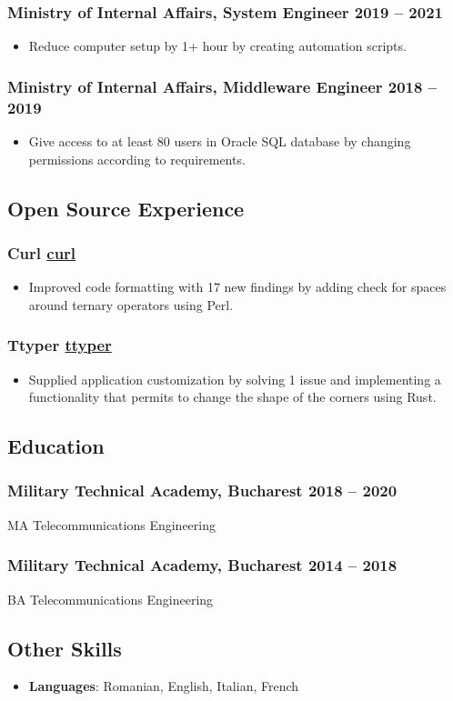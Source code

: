 \documentclass[a4paper,12pt]{article}
\begin{document}
\subsubsection*{\textbf{Ministry of Internal Affairs}, System Engineer \hfill 2019 -- 2021}
\label{sec:org07f0b0a}
\begin{itemize}
\item Reduce computer setup by 1+ hour by creating automation scripts.
\end{itemize}
\subsubsection*{\textbf{Ministry of Internal Affairs}, Middleware Engineer \hfill 2018 -- 2019}
\label{sec:orgb471112}
\begin{itemize}
\item Give access to at least 80 users in Oracle SQL database by changing permissions according
to requirements.
\end{itemize}
\subsection*{\textbf{Open Source Experience}}
\label{sec:org47d0989}
\subsubsection*{\textbf{Curl} \hfill \href{https://github.com/curl/curl}{curl}}
\label{sec:org3cd7b35}
\begin{itemize}
\item Improved code formatting with 17 new findings by adding check
for spaces around ternary operators using Perl.
\end{itemize}
\subsubsection*{\textbf{Ttyper} \hfill \href{https://github.com/maxniederman/ttyper}{ttyper}}
\label{sec:org4a7c573}
\begin{itemize}
\item Supplied application customization by solving 1 issue and implementing a functionality
that permits to change the shape of the corners using Rust.
\end{itemize}
\subsection*{\textbf{Education}}
\label{sec:org9a8ec85}
\subsubsection*{\textbf{Military Technical Academy}, Bucharest \hfill 2018 -- 2020}
\label{sec:org78206a5}
MA Telecommunications Engineering
\subsubsection*{\textbf{Military Technical Academy}, Bucharest \hfill 2014 -- 2018}
\label{sec:orgfc8665d}
BA Telecommunications Engineering
\subsection*{\textbf{Other Skills}}
\label{sec:org7243e2f}
\begin{itemize}
\item \textbf{Languages}: Romanian, English, Italian, French
\end{itemize}
\end{document}
